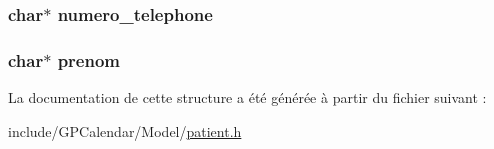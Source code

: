 \hypertarget{struct_patient_ac65f93b2b15c34c800c05832e346c98f}{
\subsubsection[{numero\-\_\-telephone}]{\setlength{\rightskip}{0pt plus 5cm}char$\ast$ numero\-\_\-telephone}}\label{struct_patient_ac65f93b2b15c34c800c05832e346c98f}
\hypertarget{struct_patient_aa7d0e9e8505d2ac627777c4168573ec9}{
\subsubsection[{prenom}]{\setlength{\rightskip}{0pt plus 5cm}char$\ast$ prenom}}\label{struct_patient_aa7d0e9e8505d2ac627777c4168573ec9}


La documentation de cette structure a été générée à partir du fichier suivant \-:\begin{DoxyCompactItemize}
\item 
include/\-G\-P\-Calendar/\-Model/\hyperlink{patient_8h}{patient.\-h}\end{DoxyCompactItemize}
